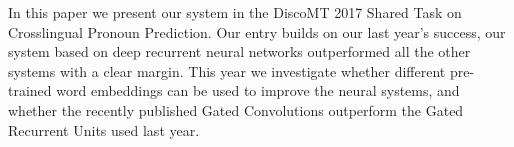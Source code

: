 In this paper we present our system in the DiscoMT 2017 Shared Task on Crosslingual Pronoun Prediction. Our entry builds on our last year's success, our system based on deep recurrent neural networks outperformed all the other systems with a clear margin. This year we investigate whether different pre-trained word embeddings can be used to improve the neural systems, and whether the recently published Gated Convolutions outperform the Gated Recurrent Units used last year.
